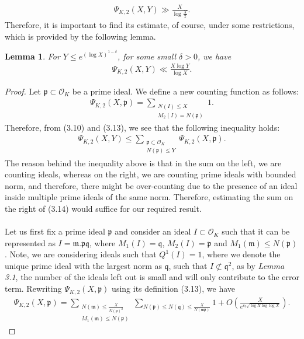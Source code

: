 \documentclass[12pt]{article}
\numberwithin{equation}{section}
\newtheorem{lemma}[theorem]{Lemma}
\numberwithin{equation}{section}
\begin{document}
\begin{align}
     \Psi_{K,2}(X,Y) \gg \frac{X}{\log \frac{X}{2}} .\nonumber
\end{align}
Therefore, it is important to find its estimate, of course, under some restrictions, which is provided by the following lemma.
\begin{lemma}
    For $Y \leq e^{(\log X)^{1-\delta}}$, for some small $\delta >0$, we have
    \begin{align}
        \Psi_{K,2}(X,Y) \ll \frac{X\log Y}{\log X}.
    \end{align}
\end{lemma}
\begin{proof}
    Let $\mathfrak{p} \subset \mathcal{O}_K$ be a prime ideal. We define a new counting function as follows:
    \begin{align}
        \Psi_{K,2}(X,\mathfrak{p}) = \sum_{\substack{N(I) \leq X \\ M_2(I)=N(\mathfrak{p})}}1.
    \end{align}
    Therefore, from (3.10) and (3.13), we see that the following inequality holds:
    \begin{align}
        \Psi_{K,2}(X,Y) \leq \sum_{\substack{\mathfrak{p} \subset \mathcal{O}_K \\ N(\mathfrak{p}) \leq Y}}\Psi_{K,2}(X,\mathfrak{p}).
    \end{align}
    The reason behind the inequality above is that in the sum on the left, we are counting ideals, whereas on the right, we are counting prime ideals with bounded norm, and therefore, there might be over-counting due to the presence of an ideal inside multiple prime ideals of the same norm. Therefore, estimating the sum on the right of (3.14) would suffice for our required result. \\ \\
    Let us first fix a prime ideal $\mathfrak{p}$ and consider an ideal $I \subset \mathcal{O}_K$ such that it can be represented as $I = \mathfrak{m.pq}$, where $M_1(I)=\mathfrak{q}$, $M_2(I)=\mathfrak{p}$ and $M_1(\mathfrak{m}) \leq N(\mathfrak{p})$. Note, we are considering ideals such that $Q^1(I)=1$, where we denote the unique prime ideal with the largest norm as $\mathfrak{q}$, such that $I \not \subset \mathfrak{q}^2$, as by \textit{Lemma 3.1}, the number of the ideals left out is small and will only contribute to the error term. Rewriting $\Psi_{K,2}(X,\mathfrak{p})$ using its definition (3.13), we have
    \begin{align}
          \Psi_{K,2}(X,\mathfrak{p}) = \sum_{\substack{N(\mathfrak{m}) \leq \frac{X}{N(\mathfrak{p})^2} \\ M_1(\mathfrak{m})\leq N(\mathfrak{p})}}\sum_{N(\mathfrak{p})\leq N(\mathfrak{q})\leq \frac{X}{N(\mathfrak{mp})}} 1 + O\left(\frac{X}{e^{c_3\sqrt{\log X\log\log X}}}\right).

\end{align}
\end{proof}
\end{document}
